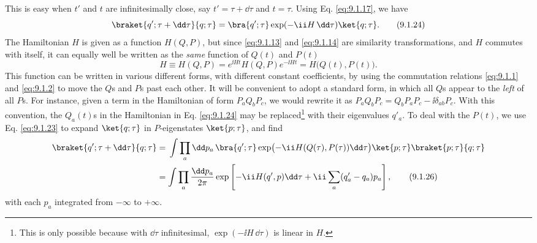 This is easy when $t'$ and $t$ are infinitesimally close, say
$t'=\tau+\dd\tau$ and $t=\tau$. Using Eq. \eqref{eq:9.1.17}, we have
\begin{equation}
  \braket{q';\tau+\dd\tau}{q;\tau}
  =\bra{q';\tau}\exp(-\ii H\,\dd\tau)\ket{q;\tau}.
  \tag{9.1.24}\label{eq:9.1.24}
\end{equation}
The Hamiltonian $H$ is given as a function $H(Q,P)$, but since \eqref{eq:9.1.13}
and \eqref{eq:9.1.14} are similarity transformations, and $H$ commutes with itself,
it can equally well be written as the \emph{same} function of $Q(t)$ and
$P(t)$
\begin{equation}
  H\equiv H(Q,P)=e^{\ii Ht}H(Q,P)e^{-\ii Ht}=H\bigl(Q(t),P(t)\bigr).
  \tag{9.1.25}\label{eq:9.1.25}
\end{equation}
This function can be written in various different forms, with different
constant coefficients, by using the commutation relations \eqref{eq:9.1.1} and
\eqref{eq:9.1.2} to move the $Q$s and $P$s past each other. It will be convenient to
adopt a standard form, in which all $Q$s appear to the \emph{left} of all
$P$s. For instance, given a term in the Hamiltonian of form $P_aQ_bP_c$,
we would rewrite it as $P_aQ_bP_c=Q_bP_aP_c-\ii\delta_{ab}P_c$. With this
convention, the $Q_a(t)$s in the Hamiltonian in Eq. \eqref{eq:9.1.24} may be
replaced\footnote{This is only possible because with $\dd\tau$ infinitesimal,
$\exp(-\ii H\,\dd\tau)$ is linear in $H$.} with their eigenvalues $q'_a$. To deal
with the $P(t)$, we use Eq. \eqref{eq:9.1.23} to expand $\ket{q;\tau}$ in
$P$-eigenstates $\ket{p;\tau}$, and find
\begin{align}
  \braket{q';\tau+\dd\tau}{q;\tau}
  &={}
  \int\prod_a \dd p_a\,
  \bra{q';\tau}\exp\bigl(-\ii H(Q(\tau),P(\tau))\dd\tau\bigr)\ket{p;\tau}
  \braket{p;\tau}{q;\tau}
  \notag\\
  &=\int\prod_a\frac{\dd p_a}{2\pi}
  \exp\left[-\ii H(q',p)\dd\tau+\ii\sum_a(q'_a-q_a)p_a\right],
  \tag{9.1.26}\label{eq:9.1.26}
\end{align}
with each $p_a$ integrated from $-\infty$ to $+\infty$.

